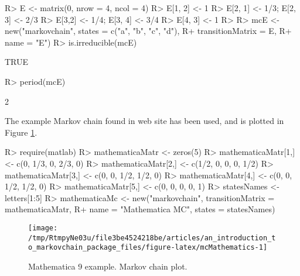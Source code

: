 \documentclass[article,nojss]{jss}
\begin{document}
\begin{CodeChunk}

\begin{CodeInput}
R> E <- matrix(0, nrow = 4, ncol = 4)
R> E[1, 2] <- 1
R> E[2, 1] <- 1/3; E[2, 3] <- 2/3
R> E[3,2] <- 1/4; E[3, 4] <- 3/4
R> E[4, 3] <- 1
R> 
R> mcE <- new("markovchain", states = c("a", "b", "c", "d"), 
R+      transitionMatrix = E, 
R+      name = "E")
R> is.irreducible(mcE)
\end{CodeInput}

\begin{CodeOutput}
[1] TRUE
\end{CodeOutput}

\begin{CodeInput}
R> period(mcE)
\end{CodeInput}

\begin{CodeOutput}
[1] 2
\end{CodeOutput}
\end{CodeChunk}

The example Markov chain found in  web site \citep{mathematica9MarkovChain} has
been used, and is plotted in Figure \ref{fig:mcMathematics}.

\begin{CodeChunk}

\begin{CodeInput}
R> require(matlab)
R> mathematicaMatr <- zeros(5)
R> mathematicaMatr[1,] <- c(0, 1/3, 0, 2/3, 0)
R> mathematicaMatr[2,] <- c(1/2, 0, 0, 0, 1/2)
R> mathematicaMatr[3,] <- c(0, 0, 1/2, 1/2, 0)
R> mathematicaMatr[4,] <- c(0, 0, 1/2, 1/2, 0)
R> mathematicaMatr[5,] <- c(0, 0, 0, 0, 1)
R> statesNames <- letters[1:5]
R> mathematicaMc <- new("markovchain", transitionMatrix = mathematicaMatr,
R+                    name = "Mathematica MC", states = statesNames)
\end{CodeInput}
\end{CodeChunk}

\begin{CodeChunk}
\begin{figure}

{\centering \texttt{[image: /tmp/RtmpyNe03u/file3be4524218be/articles/an\_introduction\_to\_markovchain\_package\_files/figure-latex/mcMathematics-1]} 

}

\caption[Mathematica 9 example]{Mathematica 9 example. Markov chain plot.}\label{fig:mcMathematics}
\end{figure}
\end{CodeChunk}
\end{document}
